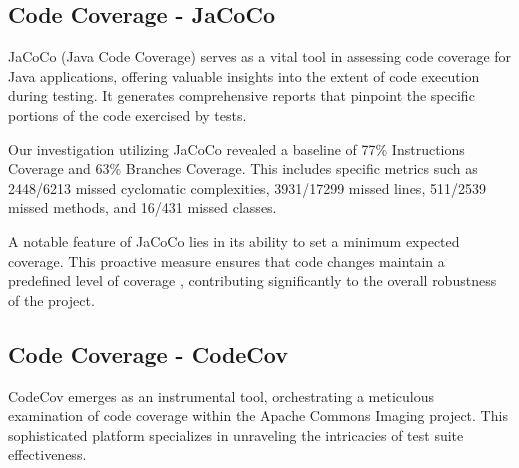 \documentclass[sigconf]{acmart}
\begin{document}
\subsection{Code Coverage - JaCoCo}
JaCoCo \cite{jacoco} (Java Code Coverage) serves as a vital tool in assessing code coverage for Java applications, offering valuable insights into the extent of code execution during testing. It generates comprehensive reports that pinpoint the specific portions of the code exercised by tests.

Our investigation utilizing JaCoCo revealed a baseline of 77\% Instructions Coverage and 63\% Branches Coverage. This includes specific metrics such as 2448/6213 missed cyclomatic complexities, 3931/17299 missed lines, 511/2539 missed methods, and 16/431 missed classes.

A notable feature of JaCoCo lies in its ability to set a minimum expected coverage. This proactive measure ensures that code changes maintain a predefined level of coverage \cite{jacoco-check-mojo}, contributing significantly to the overall robustness of the project.

\subsection{Code Coverage - CodeCov}
CodeCov \cite{codecov} emerges as an instrumental tool, orchestrating a meticulous examination of code coverage within the Apache Commons Imaging project. This sophisticated platform specializes in unraveling the intricacies of test suite effectiveness.
\end{document}
